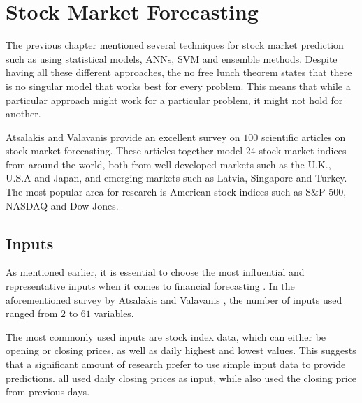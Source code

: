 \documentclass{UoYCSproject}
\begin{document}
\section{Stock Market Forecasting}
The previous chapter mentioned several techniques for stock market prediction such as using statistical models, ANNs, SVM and ensemble methods. Despite having all these different approaches, the no free lunch theorem \cite{wolpert1997no} states that there is no singular model that works best for every problem. This means that while a particular approach might work for a particular problem, it might not hold for another. 

Atsalakis and Valavanis \cite{atsalakis2009surveying} provide an excellent survey on $100$ scientific articles on stock market forecasting. These articles together model $24$ stock market indices from around the world, both from well developed markets such as the U.K., U.S.A and Japan, and emerging markets such as Latvia, Singapore and Turkey. The most popular area for research is American stock indices such as S\&P 500, NASDAQ and Dow Jones.

\subsection{Inputs}
As mentioned earlier, it is essential to choose the most influential and representative inputs when it comes to financial forecasting \cite{zhong2017forecasting}. In the aforementioned survey by Atsalakis and Valavanis \cite{atsalakis2009surveying}, the number of inputs used ranged from $2$ to $61$ variables. 

The most commonly used inputs are stock index data, which can either be opening or closing prices, as well as daily highest and lowest values. This suggests that a significant amount of research prefer to use simple input data to provide predictions. \cite{barnes2000study, donaldson1999neural, halliday2004equity, tan1995conservative, pai2005hybrid, pantazopoulos1998financial} all used daily closing prices as input, while \cite{andreou2000testing, fernandez2000profitability, pan2005predicting,tang2002web} also used the closing price from previous days. 
\end{document}
